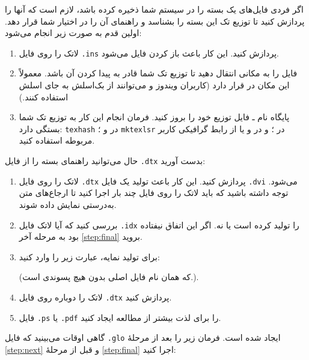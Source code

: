 اگر فردی فایل‌های یک بسته را در سیستم شما ذخیره کرده باشد، لازم است که آنها را پردازش کنید تا توزیع تک این بسته‌ را بشناسد و راهنمای آن را در اختیار شما قرار دهد. اولین قدم به صورت زیر انجام می‌شود:

\begin{enumerate}
\item لاتک را روی فایل \texttt{.ins} پردازش کنید. این کار باعث باز کردن فایل   می‌شود.
\item فایل  را به مکانی انتقال دهید تا توزیع تک شما قادر به پیدا کردن آن باشد. معمولاً این مکان در  \texttt{} قرار دارد 
(کاربران ویندوز و  می‌توانند از بک‌اسلش به جای اسلش استفاده کنند.)
\item پایگاه نام ـ فایل توزیع خود را بروز کنید. فرمان انجام این کار به توزیع تک شما بستگی دارد: \texttt{texhash} در  و ؛ \texttt{mktexlsr} در ؛ و 
در  و یا از رابط گرافیکی کاربر مربوطه استفاده کنید.
\end{enumerate}

\noindent حال می‌توانید راهنمای بسته را از فایل \texttt{.dtx} بدست آورید:

\begin{enumerate}
\item لاتک را روی فایل \texttt{.dtx} پردازش کنید. این کار باعث تولید یک فایل \texttt{.dvi} می‌شود. توجه داشته باشید که باید لاتک را روی فایل چند بار اجرا کنید تا ارجاع‌های متن به‌درستی نمایش داده شوند.
\item بررسی کنید که آیا لاتک فایل \texttt{.idx} را تولید کرده است یا نه. اگر این اتفاق نیفتاده بود به مرحله آخر 
\ref{step:final} بروید.
\item برای تولید نمایه، عبارت زیر را وارد کنید:\\
\setLR        


\setRL

        (که \textit{} همان نام فایل اصلی بدون هیچ پسوندی است.).
 \item لاتک را دوباره روی فایل \texttt{.dtx} پردازش کنید.\label{step:next}
    
\item فایل \texttt{.ps} یا \texttt{.pdf}
  را برای لذت بیشتر از مطالعه ایجاد کنید.\label{step:final}
  
\end{enumerate}

گاهی اوقات می‌بینید که فایل \texttt{.glo} ایجاد شده است. فرمان زیر را بعد از مرحلهٔ 
\ref{step:next} و قبل از مرحلهٔ 
\ref{step:final}  اجرا کنید:

